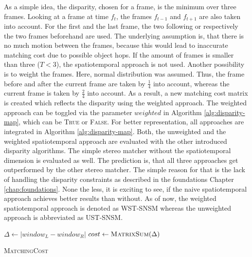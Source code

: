 \noindent As a simple idea, the disparity, chosen for a frame, is the minimum over three frames.
Looking at a frame at time $f_t$, the frames $f_{t-1}$ and $f_{t+1}$ are also taken into account.
For the first and the last frame, the two following or respectively the two frames beforehand are used.
The underlying assumption is, that there is no much motion between the frames, because this would lead to inaccurate matching cost due to possible object hops.
If the amount of frames is smaller than three ($T < 3$), the spatiotemporal approach is not used.
Another possibility is to weight the frames.
Here, normal distribution was assumed.
Thus, the frame before and after the current frame are taken by $\frac{1}{4}$ into account, whereas the current frame is taken by $\frac{2}{4}$ into account.
As a result, a new matching cost matrix is created which reflects the disparity using the weighted approach.
The weighted approach can be toggled via the parameter $weighted$ in Algorithm \ref{alg:disparity-map}, which can be \textsc{True} or \textsc{False}.
For better representation, all approaches are integrated in Algorithm \ref{alg:disparity-map}.
Both, the unweighted and the weighted spatiotemporal approach are evaluated with the other introduced disparity algorithms.
The simple stereo matcher without the spatiotemporal dimension is evaluated as well.
The prediction is, that all three approaches get outperformed by the other stereo matcher.
The simple reason for that is the lack of handling the disparity constraints as described in the foundations Chapter \ref{chap:foundations}.
None the less, it is exciting to see, if the naive spatiotemporal approach achieves better results than without.
As of now, the weighted spatiotemporal approach is denoted as \textsc{WST-SNSM} whereas the unweighted approach is abbreviated as \textsc{UST-SNSM}.

\begin{algorithm}[h!]
\DontPrintSemicolon
{}
$\Delta \gets |window_{L} - window_{R}|$\;
$cost \gets \textsc{MatrixSum}(\Delta)$\;
\;
\caption{\textsc{MatchingCost}}
\label{alg:matchingcost}
\end{algorithm}

